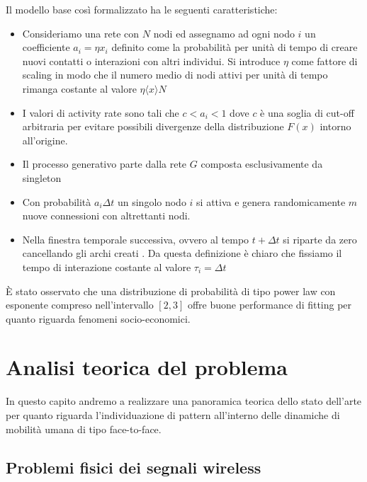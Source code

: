 \documentclass[12pt,twoside]{report}
\begin{document}
	
	
	
	
	Il modello base così formalizzato ha le seguenti caratteristiche:
	
	\begin{itemize}
	    \item Consideriamo una rete con $N$ nodi ed assegnamo ad ogni nodo $i$ un coefficiente $a_i = \eta x_i$ definito come la probabilità per unità di tempo di creare nuovi contatti o interazioni con altri individui. Si introduce $\eta$ come fattore di scaling in modo che il numero medio di nodi attivi per unità di tempo rimanga costante al valore $\eta\langle x \rangle N$
	    \item I valori di activity rate sono tali che $c < a_i < 1$ dove $c$ è una soglia di cut-off arbitraria per evitare possibili divergenze della distribuzione $F(x)$ intorno all'origine.
	    \item Il processo generativo parte dalla rete $G$ composta esclusivamente da singleton
	    \item Con probabilità $a_i \Delta t $ un singolo nodo $i$ si attiva e genera randomicamente $m$ nuove connessioni con altrettanti nodi.
	    \item Nella finestra temporale successiva, ovvero al tempo $t + \Delta t$ si riparte da zero cancellando gli archi creati . Da questa definizione è chiaro che fissiamo il tempo di interazione costante al valore $\tau_i = \Delta t$
	\end{itemize}
	
	È stato osservato che una distribuzione di probabilità di tipo power law con esponente compreso nell'intervallo $[2,3]$ offre buone performance di fitting per quanto riguarda fenomeni socio-economici.
	
	\clearpage
	
	\chapter{Analisi teorica del problema}
	
	In questo capito andremo a realizzare una panoramica teorica dello stato dell'arte per quanto riguarda l'individuazione di pattern all'interno delle dinamiche di mobilità umana di tipo face-to-face. 
	
	\section{Problemi fisici dei segnali wireless}
    
\end{document}
